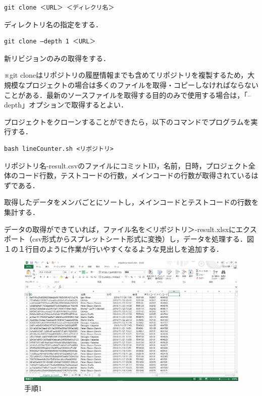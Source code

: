 {
\small
\begin{verbatim}
git clone ＜URL＞ ＜ディレクリ名＞
\end{verbatim}
}
ディレクトリ名の指定をする．

{
\small
\begin{verbatim}
git clone –depth 1 ＜URL＞
\end{verbatim}
}
新リビジョンのみの取得をする．

\hfil
※git cloneはリポジトリの履歴情報までも含めてリポジトリを複製するため，大規模なプロジェクトの場合は多くのファイルを取得・コピーしなければならないことがある．最新のソースファイルを取得する目的のみで使用する場合は，「--depth」オプションで取得するとよい．

プロジェクトをクローンすることができたら，以下のコマンドでプログラムを実行する．
\begin{lstlisting}[basicstyle=\ttfamily\footnotesize, frame=single]
bash lineCounter.sh <リポジトリ>
\end{lstlisting}
\hfil

リポジトリ名-result.csvのファイルにコミットID，名前，日時，プロジェクト全体のコード行数，テストコードの行数，メインコードの行数が取得されているはずである．

\newpage

取得したデータをメンバごとにソートし，メインコードとテストコードの行数を集計する．

データの取得ができていれば，ファイル名を＜リポジトリ＞-result.xlsxにエクスポート（csv形式からスプレットシート形式に変換）し，データを処理する．図１の１行目のように作業が行いやすくなるような見出しを追加する．

\begin{figure}[h]
\centering
\includegraphics[width=13cm]{process1.png}
\caption{手順1}
\end{figure}

